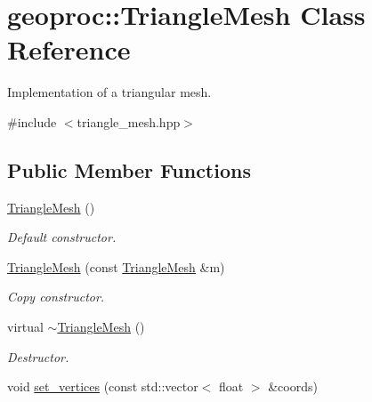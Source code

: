 \hypertarget{classgeoproc_1_1TriangleMesh}{}\section{geoproc\+:\+:Triangle\+Mesh Class Reference}
\label{classgeoproc_1_1TriangleMesh}


Implementation of a triangular mesh.  




{\ttfamily \#include $<$triangle\+\_\+mesh.\+hpp$>$}

\subsection*{Public Member Functions}
\begin{DoxyCompactItemize}
\item 
\mbox{\label{classgeoproc_1_1TriangleMesh_a73c49980eb81e2df75242515b5ef1ed7}} 
\hyperlink{classgeoproc_1_1TriangleMesh_a73c49980eb81e2df75242515b5ef1ed7}{Triangle\+Mesh} ()
\begin{DoxyCompactList}\small\item\em Default constructor. \end{DoxyCompactList}\item 
\mbox{\label{classgeoproc_1_1TriangleMesh_ae660da7765a405ac44640d2ad46a6903}} 
\hyperlink{classgeoproc_1_1TriangleMesh_ae660da7765a405ac44640d2ad46a6903}{Triangle\+Mesh} (const \hyperlink{classgeoproc_1_1TriangleMesh}{Triangle\+Mesh} \&m)
\begin{DoxyCompactList}\small\item\em Copy constructor. \end{DoxyCompactList}\item 
\mbox{\label{classgeoproc_1_1TriangleMesh_a587721dac1419702470fbca953fb7f1c}} 
virtual \hyperlink{classgeoproc_1_1TriangleMesh_a587721dac1419702470fbca953fb7f1c}{$\sim$\+Triangle\+Mesh} ()
\begin{DoxyCompactList}\small\item\em Destructor. \end{DoxyCompactList}\item 
void \hyperlink{classgeoproc_1_1TriangleMesh_aa9ca26f1ededecd289d1a8800dca2c23}{set\+\_\+vertices} (const std\+::vector$<$ float $>$ \&coords)

\end{DoxyCompactItemize}
